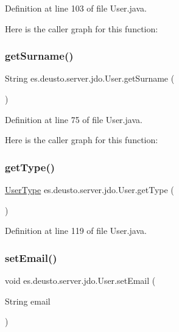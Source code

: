 Definition at line 103 of file User.\+java.

Here is the caller graph for this function\+:
\mbox{\label{classes_1_1deusto_1_1server_1_1jdo_1_1_user_adc7114247c7881e3f9e0fd14b7905f9a}} 
\subsubsection{\texorpdfstring{getSurname()}{getSurname()}}
{\footnotesize\ttfamily String es.\+deusto.\+server.\+jdo.\+User.\+get\+Surname (\begin{DoxyParamCaption}{ }\end{DoxyParamCaption})}



Definition at line 75 of file User.\+java.

Here is the caller graph for this function\+:
\mbox{\label{classes_1_1deusto_1_1server_1_1jdo_1_1_user_ac7a47d7d9f3b6212ea22d2fe6b0e8457}} 
\subsubsection{\texorpdfstring{getType()}{getType()}}
{\footnotesize\ttfamily \mbox{\hyperlink{enumes_1_1deusto_1_1server_1_1jdo_1_1_user_type}{User\+Type}} es.\+deusto.\+server.\+jdo.\+User.\+get\+Type (\begin{DoxyParamCaption}{ }\end{DoxyParamCaption})}



Definition at line 119 of file User.\+java.

\mbox{\label{classes_1_1deusto_1_1server_1_1jdo_1_1_user_affc32b9cc71d8e45cb695339b34a2abd}} 
\subsubsection{\texorpdfstring{setEmail()}{setEmail()}}
{\footnotesize\ttfamily void es.\+deusto.\+server.\+jdo.\+User.\+set\+Email (\begin{DoxyParamCaption}\item[{String}]{email }\end{DoxyParamCaption})}



